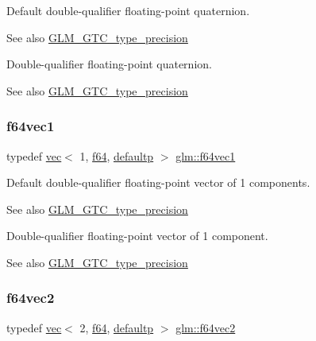 Default double-\/qualifier floating-\/point quaternion. \begin{DoxySeeAlso}{See also}
\mbox{\hyperlink{group__gtc__type__precision}{G\+L\+M\+\_\+\+G\+T\+C\+\_\+type\+\_\+precision}}
\end{DoxySeeAlso}
Double-\/qualifier floating-\/point quaternion. \begin{DoxySeeAlso}{See also}
\mbox{\hyperlink{group__gtc__type__precision}{G\+L\+M\+\_\+\+G\+T\+C\+\_\+type\+\_\+precision}} 
\end{DoxySeeAlso}
\mbox{\label{group__gtc__type__precision_ga6478d0530433bb907956a46b2cd99161}} 
\subsubsection{\texorpdfstring{f64vec1}{f64vec1}}
{\footnotesize\ttfamily typedef \mbox{\hyperlink{structglm_1_1vec}{vec}}$<$ 1, \mbox{\hyperlink{group__gtc__type__precision_ga2bba392e555124b36cde6abba349bab3}{f64}}, \mbox{\hyperlink{namespaceglm_a36ed105b07c7746804d7fdc7cc90ff25a9d21ccd8b5a009ec7eb7677befc3bf51}{defaultp}} $>$ \mbox{\hyperlink{group__gtc__type__precision_ga6478d0530433bb907956a46b2cd99161}{glm\+::f64vec1}}}

Default double-\/qualifier floating-\/point vector of 1 components. \begin{DoxySeeAlso}{See also}
\mbox{\hyperlink{group__gtc__type__precision}{G\+L\+M\+\_\+\+G\+T\+C\+\_\+type\+\_\+precision}}
\end{DoxySeeAlso}
Double-\/qualifier floating-\/point vector of 1 component. \begin{DoxySeeAlso}{See also}
\mbox{\hyperlink{group__gtc__type__precision}{G\+L\+M\+\_\+\+G\+T\+C\+\_\+type\+\_\+precision}} 
\end{DoxySeeAlso}
\mbox{\label{group__gtc__type__precision_ga6c794781267fd5c810d9a6e7086e02a6}} 
\subsubsection{\texorpdfstring{f64vec2}{f64vec2}}
{\footnotesize\ttfamily typedef \mbox{\hyperlink{structglm_1_1vec}{vec}}$<$ 2, \mbox{\hyperlink{group__gtc__type__precision_ga2bba392e555124b36cde6abba349bab3}{f64}}, \mbox{\hyperlink{namespaceglm_a36ed105b07c7746804d7fdc7cc90ff25a9d21ccd8b5a009ec7eb7677befc3bf51}{defaultp}} $>$ \mbox{\hyperlink{group__gtc__type__precision_ga6c794781267fd5c810d9a6e7086e02a6}{glm\+::f64vec2}}}

